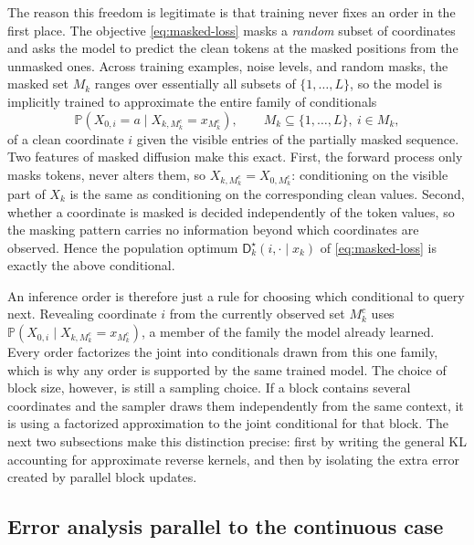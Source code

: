 \documentclass[10pt,a4paper]{amsart}
\numberwithin{equation}{section}
\newcommand{\Pp}{\mathbb{P}}
\newcommand{\dstar}{\mathsf{D}^{\star}}
\begin{document}
The reason this freedom is legitimate is that training never fixes an order in
the first place.  The objective \eqref{eq:masked-loss} masks a \emph{random}
subset of coordinates and asks the model to predict the clean tokens at the
masked positions from the unmasked ones.  Across training examples, noise
levels, and random masks, the masked set $M_k$ ranges over essentially all
subsets of $\{1,\ldots,L\}$, so the model is implicitly trained to approximate
the entire family of conditionals
\[
    \Pp\!\left(X_{0,i}=a \mid X_{k,M_k^c}=x_{M_k^c}\right),
    \qquad M_k\subseteq\{1,\ldots,L\},\ i\in M_k,
\]
of a clean coordinate $i$ given the visible entries of the partially masked
sequence.  Two features of masked diffusion make this exact.  First, the forward
process only masks tokens, never alters them, so
$X_{k,M_k^c}=X_{0,M_k^c}$: conditioning on the visible part of $X_k$ is the same
as conditioning on the corresponding clean values.  Second, whether a coordinate
is masked is decided independently of the token values, so the masking pattern
carries no information beyond which coordinates are observed.  Hence the
population optimum $\dstar_k(i,\cdot\mid x_k)$ of \eqref{eq:masked-loss} is
exactly the above conditional.

An inference order is therefore just a rule for choosing which conditional to
query next.  Revealing coordinate $i$ from the currently observed set $M_k^c$
uses
$\Pp(X_{0,i}\mid X_{k,M_k^c}=x_{M_k^c})$, a member of the family the model
already learned.  Every order factorizes the joint into
conditionals drawn from this one family, which is why any order is supported by
the same trained model.  The choice of block size, however, is still a sampling
choice.  If a block contains several coordinates and the sampler draws them
independently from the same context, it is using a factorized approximation to
the joint conditional for that block.  The next two subsections make this
distinction precise: first by writing the general KL accounting for approximate
reverse kernels, and then by isolating the extra error created by parallel block
updates.

\subsection{Error analysis parallel to the continuous case}
\end{document}
